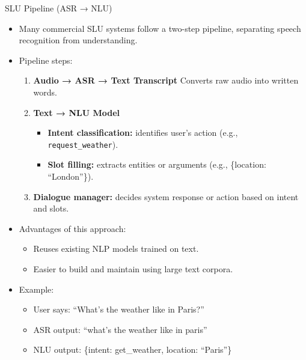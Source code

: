 \begin{frame}[allowframebreaks]{SLU Pipeline (ASR → NLU)}

\begin{itemize}
    \item Many commercial SLU systems follow a two-step pipeline, separating speech recognition from understanding.

    \item Pipeline steps:
    \begin{enumerate}
        \item \textbf{Audio → ASR → Text Transcript}  
        Converts raw audio into written words.
        
        \item \textbf{Text → NLU Model}  
        \begin{itemize}
            \item \textbf{Intent classification:} identifies user’s action (e.g., \texttt{request\_weather}).  
            \item \textbf{Slot filling:} extracts entities or arguments (e.g., \{location: ``London''\}).
        \end{itemize}
        
        \item \textbf{Dialogue manager:} decides system response or action based on intent and slots.
    \end{enumerate}
\framebreak
    \item Advantages of this approach:
    \begin{itemize}
        \item Reuses existing NLP models trained on text.
        \item Easier to build and maintain using large text corpora.
    \end{itemize}

    \item Example:
    \begin{itemize}
        \item User says: ``What’s the weather like in Paris?''  
        \item ASR output: ``what’s the weather like in paris''  
        \item NLU output: \{intent: get\_weather, location: ``Paris''\}
    \end{itemize}
\end{itemize}

\end{frame}


